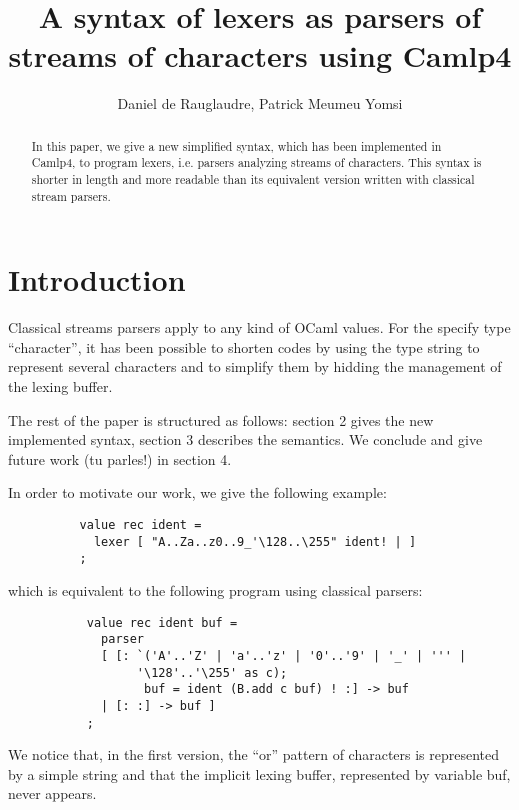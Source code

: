 \documentclass[11pt]{article}
\begin{document}
\title{A syntax of lexers as parsers of streams of characters using Camlp4}
\date{}
\author{Daniel de Rauglaudre, Patrick Meumeu Yomsi}
\thispagestyle{empty}

\maketitle

\begin{abstract}
In this paper, we give a new simplified syntax, which has been
implemented in Camlp4, to program lexers, i.e. parsers analyzing
streams of characters. This syntax is shorter in length and more
readable than its equivalent version written with classical stream
parsers.
\end{abstract}

\section{Introduction}

Classical streams parsers apply to any kind of OCaml values. For
the specify type ``character'', it has been possible to shorten codes by
using the type string to represent several characters and to simplify
them by hidding the management of the lexing buffer.

The rest of the paper is structured as follows: section 2 gives the
new implemented syntax, section 3 describes the semantics. We conclude
and give future work (tu parles!) in section 4.

In order to motivate our work, we give the following example:

\begin{verbatim}
          value rec ident =
            lexer [ "A..Za..z0..9_'\128..\255" ident! | ]
          ;
\end{verbatim}

which is equivalent to the following program using classical parsers:

\begin{verbatim}
           value rec ident buf =
             parser
             [ [: `('A'..'Z' | 'a'..'z' | '0'..'9' | '_' | ''' |
                  '\128'..'\255' as c);
                   buf = ident (B.add c buf) ! :] -> buf
             | [: :] -> buf ]
           ;
\end{verbatim}

We notice that, in the first version, the ``or'' pattern of characters
is represented by a simple string and that the implicit lexing buffer,
represented by variable buf, never appears.
\end{document}
